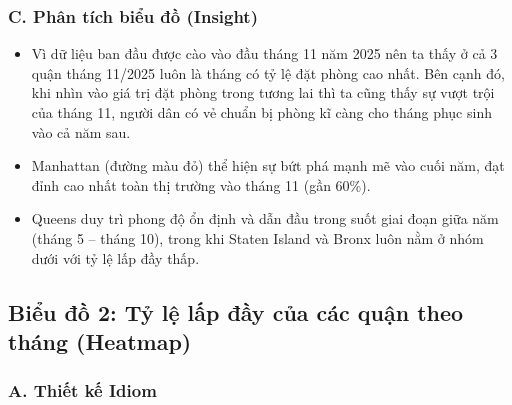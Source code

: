 \subsubsection*{C. Phân tích biểu đồ (Insight)}

\begin{itemize}
    \item Vì dữ liệu ban đầu được cào vào đầu tháng 11 năm 2025 nên ta thấy ở cả 3 quận tháng 11/2025 luôn là tháng có tỷ lệ đặt phòng cao nhất. Bên cạnh đó, khi nhìn vào giá trị đặt phòng trong tương lai thì ta cũng thấy sự vượt trội của tháng 11, người dân có vẻ chuẩn bị phòng kĩ càng cho tháng phục sinh vào cả năm sau.
    \item Manhattan (đường màu đỏ) thể hiện sự bứt phá mạnh mẽ vào cuối năm, đạt đỉnh cao nhất toàn thị trường vào tháng 11 (gần 60\%).
    \item Queens duy trì phong độ ổn định và dẫn đầu trong suốt giai đoạn giữa năm (tháng 5 -- tháng 10), trong khi Staten Island và Bronx luôn nằm ở nhóm dưới với tỷ lệ lấp đầy thấp.
\end{itemize}

\subsection{Biểu đồ 2: Tỷ lệ lấp đầy của các quận theo tháng (Heatmap)}

\subsubsection*{A. Thiết kế Idiom}

